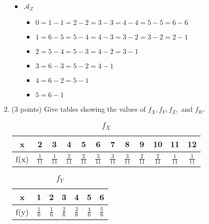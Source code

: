 \documentclass[11pt]{article}
\newcommand{\A}{{\mathcal{A}}}
\begin{document}
\begin{enumerate}
\begin{enumerate}
\begin{itemize}
\begin{itemize}
			\end{itemize}
	 
	 	\item $\A_Z$
		
			\begin{itemize}
			
				\item $0 = 1 - 1 = 2 - 2 = 3 - 3 = 4 - 4 = 5 - 5 = 6 - 6$
				\item $1 = 6 - 5 = 5 - 4 = 4 - 3 = 3 - 2 = 3 - 2 = 2 - 1$
				\item $2 = 5 - 4 = 5 - 3 = 4 - 2 = 3 - 1$
				\item $3 = 6 - 3 = 5 - 2 = 4 - 1$
				\item $4 = 6 - 2 = 5 - 1$
				\item $5 = 6 - 1$
			
			\end{itemize}
	 
	 \end{itemize}
	 
	 \item (3 points) Give tables showing the values of $f_X,f_Y,f_Z,$ and $f_W$.
	 
	 
		
		\begin{table}[h!]
			\begin{center}
			\caption{$f_X$}
				\begin{tabular}{|c|c|c|c|c|c|c|c|c|c|c|c|}
				\hline
				x & 2 & 3 & 4 & 5 & 6 & 7 & 8 & 9 & 10 & 11 & 12 \\ 
				\hline
				f(x) & $\frac{1}{11}$ & $\frac{1}{11}$ & $\frac{2}{11}$ & $\frac{2}{11}$ & $\frac{3}{11}$ & $\frac{3}{11}$ & $\frac{3}{11}$ & $\frac{2}{11}$ &$\frac{2}{11}$ & $\frac{1}{11}$ & $\frac{1}{11}$ \\ 
				\hline
				\end{tabular}
			\label{ }
			\end{center}
		\end{table} 
		
		\begin{table}[h!]
			\begin{center}
			\caption{$f_Y$}
				\begin{tabular}{|c|c|c|c|c|c|c|}
				\hline
				x & 1 & 2 & 3 & 4 & 5 & 6\\ 
				\hline
				f(y) & $\frac{1}{6}$ & $\frac{1}{6}$ & $\frac{2}{6}$ & $\frac{3}{6}$ & $\frac{4}{6}$ & $\frac{5}{6}$ \\ 
				\hline
				\end{tabular}
			\label{ }
			\end{center}
		\end{table} 
		

\end{enumerate}
\end{enumerate}
\end{document}
